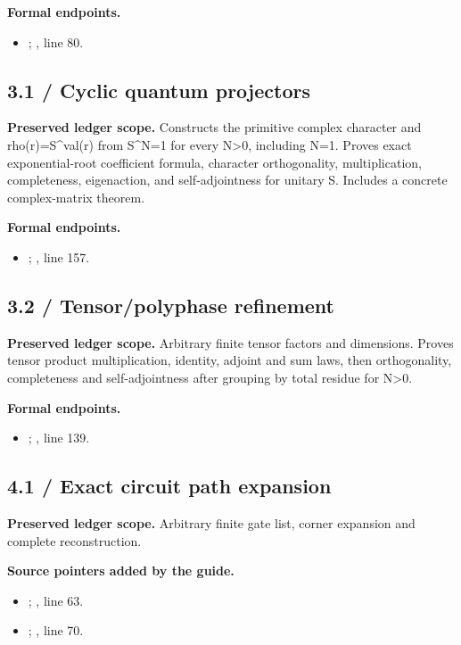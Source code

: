 \textbf{Formal endpoints.}\begin{itemize}
\item {}; , line 80.
\end{itemize}
\subsection{3.1 / Cyclic quantum projectors}
\label{result:3.1}
\textbf{Preserved ledger scope.} Constructs the primitive complex character and rho(r)=S\textasciicircum{}val(r) from S\textasciicircum{}N=1 for every N>0, including N=1. Proves exact exponential-root coefficient formula, character orthogonality, multiplication, completeness, eigenaction, and self-adjointness for unitary S. Includes a concrete complex-matrix theorem.

\textbf{Formal endpoints.}\begin{itemize}
\item {}; , line 157.
\end{itemize}
\subsection{3.2 / Tensor/polyphase refinement}
\label{result:3.2}
\textbf{Preserved ledger scope.} Arbitrary finite tensor factors and dimensions. Proves tensor product multiplication, identity, adjoint and sum laws, then orthogonality, completeness and self-adjointness after grouping by total residue for N>0.

\textbf{Formal endpoints.}\begin{itemize}
\item {}; , line 139.
\end{itemize}
\subsection{4.1 / Exact circuit path expansion}
\label{result:4.1}
\textbf{Preserved ledger scope.} Arbitrary finite gate list, corner expansion and complete reconstruction.

\textbf{Source pointers added by the guide.}\begin{itemize}
\item {}; , line 63.
\item {}; , line 70.
\end{itemize}
